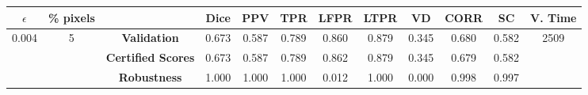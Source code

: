 \begin{longtable}{ c  c | c | c  c  c  c  c  c  c c c}
\toprule \textbf{$\epsilon$} & \textbf{\% pixels} & & \textbf{Dice} & \textbf{PPV} & \textbf{TPR} & \textbf{LFPR} & \textbf{LTPR} & \textbf{VD} & \textbf{CORR} & \textbf{SC} & \textbf{V. Time} \\
\midrule 
\multirow{3}{*}{0.004}  & \multirow{3}{*}{5} &\textbf{Validation} & 0.673 & 0.587 & 0.789 & 0.860 & 0.879 & 0.345 & 0.680 & 0.582 & \multirow{3}{*}{2509} \\
 & & \textbf{Certified Scores} & 0.673 & 0.587 & 0.789 & 0.862 & 0.879 & 0.345 & 0.679 & 0.582 & \\
& & \textbf{Robustness} & 1.000 & 1.000 & 1.000 & 0.012 & 1.000 & 0.000 & 0.998 & 0.997 & \\
\end{longtable}